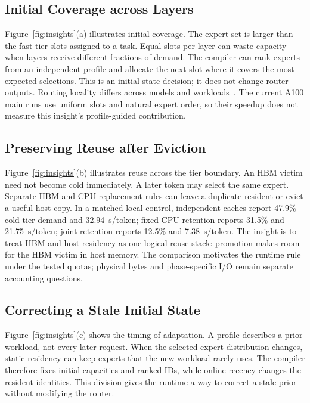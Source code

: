\documentclass[conference,9pt,letterpaper]{IEEEtran}
\begin{document}
\subsection{Initial Coverage across Layers}
Figure~\ref{fig:insights}(a) illustrates initial coverage. The expert set is larger than the fast-tier slots assigned to a task. Equal slots per layer can waste capacity when layers receive different fractions of demand. The compiler can rank experts from an independent profile and allocate the next slot where it covers the most expected selections. This is an initial-state decision; it does not change router outputs. Routing locality differs across models and workloads~\cite{routingconsistency}. The current A100 main runs use uniform slots and natural expert order, so their speedup does not measure this insight's profile-guided contribution.

\subsection{Preserving Reuse after Eviction}
Figure~\ref{fig:insights}(b) illustrates reuse across the tier boundary. An HBM victim need not become cold immediately. A later token may select the same expert. Separate HBM and CPU replacement rules can leave a duplicate resident or evict a useful host copy. In a matched local control, independent caches report 47.9\% cold-tier demand and 32.94~s/token; fixed CPU retention reports 31.5\% and 21.75~s/token; joint retention reports 12.5\% and 7.38~s/token. The insight is to treat HBM and host residency as one logical reuse stack: promotion makes room for the HBM victim in host memory. The comparison motivates the runtime rule under the tested quotas; physical bytes and phase-specific I/O remain separate accounting questions.

\subsection{Correcting a Stale Initial State}
Figure~\ref{fig:insights}(c) shows the timing of adaptation. A profile describes a prior workload, not every later request. When the selected expert distribution changes, static residency can keep experts that the new workload rarely uses. The compiler therefore fixes initial capacities and ranked IDs, while online recency changes the resident identities. This division gives the runtime a way to correct a stale prior without modifying the router.
\end{document}
